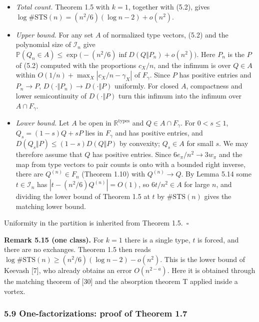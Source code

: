 \documentclass[english,11pt,a4paper]{article}
\providecommand{\tightlist}{\setlength{\itemsep}{0pt}\setlength{\parskip}{0pt}}
\begin{document}
\begin{itemize}
\tightlist
\item
  \emph{Total count.} Theorem 1.5 with \(k=1\), together with (5.2), gives \(\log\#\mathrm{STS}(n)=(n^2/6)(\log n-2)+o(n^2)\).
\item
  \emph{Upper bound.} For any set \(A\) of normalized type vectors, (5.2) and the polynomial size of \(\mathcal I_n\) give \(\mathbb P(Q_n\in A)\le\exp\bigl(-(n^2/6)\inf D(Q\Vert P_n)+o(n^2)\bigr)\). Here \(P_n\) is the \(P\) of (5.2) computed with the proportions \(c_X/n\), and the infimum is over \(Q\in A\) within \(O(1/n)+\max_X|c_X/n-\gamma_X|\) of \(F_\gamma\). Since \(P\) has positive entries and \(P_n\to P\), \(D(\cdot\Vert P_n)\to D(\cdot\Vert P)\) uniformly. For closed \(A\), compactness and lower semicontinuity of \(D(\cdot\Vert P)\) turn this infimum into the infimum over \(A\cap F_\gamma\).
\item
  \emph{Lower bound.} Let \(A\) be open in \(\mathbb R^{\mathrm{types}}\) and \(Q\in A\cap F_\gamma\). For \(0<s\le1\), \(Q_s=(1-s)Q+sP\) lies in \(F_\gamma\) and has positive entries, and \(D(Q_s\Vert P)\le(1-s)D(Q\Vert P)\) by convexity; \(Q_s\in A\) for small \(s\). We may therefore assume that \(Q\) has positive entries. Since \(6e_\pi/n^2\to3w_\pi\) and the map from type vectors to pair counts is onto with a bounded right inverse, there are \(Q^{(n)}\in F_n\) (Theorem 1.10) with \(Q^{(n)}\to Q\). By Lemma 5.14 some \(t\in\mathcal I_n\) has \(|t-(n^2/6)Q^{(n)}|=O(1)\), so \(6t/n^2\in A\) for large \(n\), and dividing the lower bound of Theorem 1.5 at \(t\) by \(\#\mathrm{STS}(n)\) gives the matching lower bound.
\end{itemize}

Uniformity in the partition is inherited from Theorem 1.5.~\(\square\)

\textbf{Remark 5.15 (one class).} For \(k=1\) there is a single type, \(t\) is forced, and there are no exchanges. Theorem 1.5 then reads \(\log\#\mathrm{STS}(n)\ge(n^2/6)(\log n-2)-o(n^2)\). This is the lower bound of Keevash {[}7{]}, who already obtains an error \(O(n^{2-a})\). Here it is obtained through the matching theorem of {[}30{]} and the absorption theorem T applied inside a vortex.

\subsubsection{5.9 One-factorizations: proof of Theorem 1.7}\label{one-factorizations-proof-of-theorem-1.7}
\end{document}
